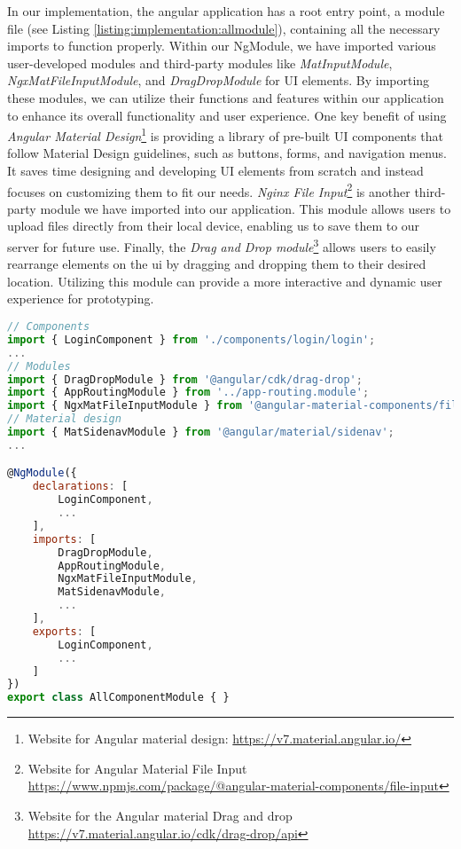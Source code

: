 In our implementation, the angular application has a root entry point, a module file (see Listing \ref{listing:implementation:allmodule}), containing all the necessary imports to function properly. 
Within our NgModule, we have imported various user-developed modules and third-party modules like \textit{MatInputModule}, \textit{NgxMatFileInputModule}, and \textit{DragDropModule} for UI elements. 
By importing these modules, we can utilize their functions and features within our application to enhance its overall functionality and user experience.
One key benefit of using \textit{Angular Material Design}\footnote{Website for Angular material design: \url{https://v7.material.angular.io/}} is providing a library of pre-built UI components that follow Material Design guidelines, such as buttons, forms, and navigation menus. 
It saves time designing and developing UI elements from scratch and instead focuses on customizing them to fit our needs.
\textit{Nginx File Input}\footnote{Website for Angular Material File Input \url{https://www.npmjs.com/package/@angular-material-components/file-input}} is another third-party module we have imported into our application. 
This module allows users to upload files directly from their local device, enabling us to save them to our server for future use.
Finally, the \textit{Drag and Drop module}\footnote{Website for the Angular material Drag and drop \url{https://v7.material.angular.io/cdk/drag-drop/api}} allows users to easily rearrange elements on the \ac{ui} by dragging and dropping them to their desired location. 
Utilizing this module can provide a more interactive and dynamic user experience for prototyping.

\begin{lstlisting}[language=JavaScript, caption=all-component.module.ts, label=listing:implementation:allmodule]
// Components
import { LoginComponent } from './components/login/login';
...
// Modules
import { DragDropModule } from '@angular/cdk/drag-drop';
import { AppRoutingModule } from '../app-routing.module';
import { NgxMatFileInputModule } from '@angular-material-components/file-input';
// Material design
import { MatSidenavModule } from '@angular/material/sidenav';
...

@NgModule({
    declarations: [
        LoginComponent,
        ...
    ],
    imports: [
        DragDropModule,
        AppRoutingModule,
        NgxMatFileInputModule,
        MatSidenavModule,
        ...
    ],
    exports: [
        LoginComponent, 
        ...
    ]
})
export class AllComponentModule { }  
\end{lstlisting}

